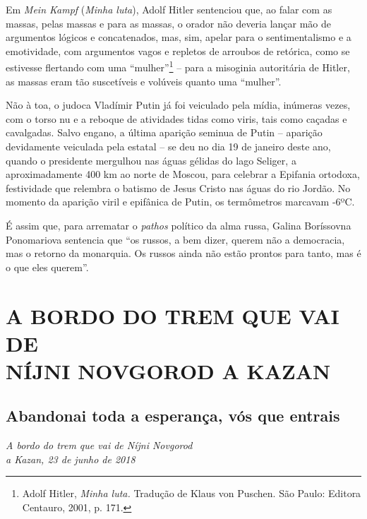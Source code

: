 Em \emph{Mein Kampf} (\emph{Minha luta}), Adolf Hitler sentenciou que,
ao falar com as massas, pelas massas e para as massas, o orador não
deveria lançar mão de argumentos lógicos e concatenados, mas, sim,
apelar para o sentimentalismo e a emotividade, com argumentos vagos e
repletos de arroubos de retórica, como se estivesse flertando com uma
``mulher''\footnote{Adolf Hitler, \emph{Minha luta.} Tradução de Klaus
  von Puschen. São Paulo: Editora Centauro, 2001, p. 171.} -- para a
misoginia autoritária de Hitler, as massas eram tão suscetíveis e
volúveis quanto uma ``mulher''.

Não à toa, o judoca Vladímir Putin já foi veiculado pela mídia, inúmeras
vezes, com o torso nu e a reboque de atividades tidas como viris, tais
como caçadas e cavalgadas. Salvo engano, a última aparição seminua de
Putin -- aparição devidamente veiculada pela  estatal -- se deu no dia
19 de janeiro deste ano, quando o presidente mergulhou nas águas gélidas
do lago Seliger, a aproximadamente 400 km ao norte de Moscou, para
celebrar a Epifania ortodoxa, festividade que relembra o batismo de
Jesus Cristo nas águas do rio Jordão. No momento da aparição viril e
epifânica de Putin, os termômetros marcavam -6ºC.

É assim que, para arrematar o \emph{pathos} político da alma russa,
Galina Boríssovna Ponomariova sentencia que ``os russos, a bem dizer,
querem não a democracia, mas o retorno da monarquia. Os russos ainda não
estão prontos para tanto, mas é o que eles querem''.

\clearpage{\pagestyle{empty}\cleardoublepage}
\movetooddpage
{}
\part*{A BORDO DO TREM QUE VAI DE\\NÍJNI NOVGOROD A KAZAN}

\chapter*{Abandonai toda a esperança, vós que entrais}

\begin{flushright}
\emph{A bordo do trem que vai de Níjni Novgorod\\a Kazan, 23 de junho de 2018}
\end{flushright}

